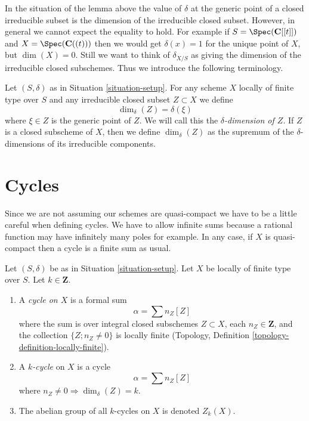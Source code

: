 \noindent
In the situation of the lemma above the
value of $\delta$ at the generic point of a closed irreducible subset
is the dimension of the irreducible closed subset.
However, in general we cannot expect the equality to hold.
For example if $S = \Spec(\mathbf{C}[[t]])$ and
$X = \Spec(\mathbf{C}((t)))$ then we would get
$\delta(x) = 1$ for the unique point of $X$, but $\dim(X) = 0$.
Still we want to think of $\delta_{X/S}$ as giving the
dimension of the irreducible closed subschemes. Thus we introduce
the following terminology.

\begin{definition}
\label{definition-delta-dimension}
Let $(S, \delta)$ as in Situation \ref{situation-setup}.
For any scheme $X$ locally of finite type over $S$
and any irreducible closed subset $Z \subset X$ we define
$$
\dim_\delta(Z) = \delta(\xi)
$$
where $\xi \in Z$ is the generic point of $Z$.
We will call this the {\it $\delta$-dimension of $Z$}.
If $Z$ is a closed subscheme of $X$, then we define
$\dim_\delta(Z)$ as the supremum of the $\delta$-dimensions
of its irreducible components.
\end{definition}







\section{Cycles}
\label{section-cycles}

\noindent
Since we are not assuming our schemes are quasi-compact we have
to be a little careful when defining cycles. We have to allow
infinite sums because a rational function may have infinitely many
poles for example. In any case, if $X$ is quasi-compact then a
cycle is a finite sum as usual.

\begin{definition}
\label{definition-cycles}
Let $(S, \delta)$ be as in Situation \ref{situation-setup}.
Let $X$ be locally of finite type over $S$.
Let $k \in \mathbf{Z}$.
\begin{enumerate}
\item A {\it cycle on $X$} is a formal sum
$$
\alpha = \sum n_Z [Z]
$$
where the sum is over integral closed subschemes $Z \subset X$,
each $n_Z \in \mathbf{Z}$, and the collection
$\{Z; n_Z \not = 0\}$ is locally finite
(Topology, Definition \ref{topology-definition-locally-finite}).
\item A {\it $k$-cycle} on $X$ is a cycle
$$
\alpha = \sum n_Z [Z]
$$
where $n_Z \not = 0 \Rightarrow \dim_\delta(Z) = k$.
\item The abelian group of all $k$-cycles on $X$ is denoted $Z_k(X)$.
\end{enumerate}
\end{definition}

